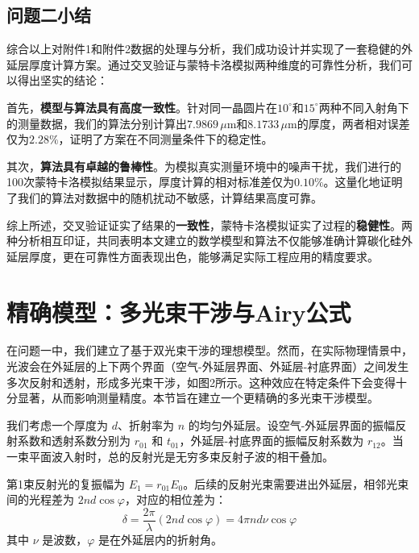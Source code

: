 \documentclass[withoutpreface,bwprint]{cumcmthesis} %
\begin{document}

\subsection{问题二小结}

综合以上对附件1和附件2数据的处理与分析，我们成功设计并实现了一套稳健的外延层厚度计算方案。通过交叉验证与蒙特卡洛模拟两种维度的可靠性分析，我们可以得出坚实的结论：

首先，\textbf{模型与算法具有高度一致性}。针对同一晶圆片在$10^\circ$和$15^\circ$两种不同入射角下的测量数据，我们的算法分别计算出$7.9869 \, \mu\text{m}$和$8.1733 \, \mu\text{m}$的厚度，两者相对误差仅为$2.28\%$，证明了方案在不同测量条件下的稳定性。

其次，\textbf{算法具有卓越的鲁棒性}。为模拟真实测量环境中的噪声干扰，我们进行的100次蒙特卡洛模拟结果显示，厚度计算的相对标准差仅为$0.10\%$。这量化地证明了我们的算法对数据中的随机扰动不敏感，计算结果高度可靠。

综上所述，交叉验证证实了结果的\textbf{一致性}，蒙特卡洛模拟证实了过程的\textbf{稳健性}。两种分析相互印证，共同表明本文建立的数学模型和算法不仅能够准确计算碳化硅外延层厚度，更在可靠性方面表现出色，能够满足实际工程应用的精度要求。

\section{精确模型：多光束干涉与Airy公式}

在问题一中，我们建立了基于双光束干涉的理想模型。然而，在实际物理情景中，光波会在外延层的上下两个界面（空气-外延层界面、外延层-衬底界面）之间发生多次反射和透射，形成多光束干涉，如图2所示。这种效应在特定条件下会变得十分显著，从而影响测量精度。本节旨在建立一个更精确的多光束干涉模型。

我们考虑一个厚度为 $d$、折射率为 $n$ 的均匀外延层。设空气-外延层界面的振幅反射系数和透射系数分别为 $r_{01}$ 和 $t_{01}$，外延层-衬底界面的振幅反射系数为 $r_{12}$。当一束平面波入射时，总的反射光是无穷多束反射子波的相干叠加。

第1束反射光的复振幅为 $E_1 = r_{01}E_0$。后续的反射光束需要进出外延层，相邻光束间的光程差为 $2nd\cos\varphi$，对应的相位差为：
$$
    \delta = \frac{2\pi}{\lambda} (2nd\cos\varphi) = 4\pi n d \nu \cos\varphi
$$
其中 $\nu$ 是波数，$\varphi$ 是在外延层内的折射角。
\end{document}
